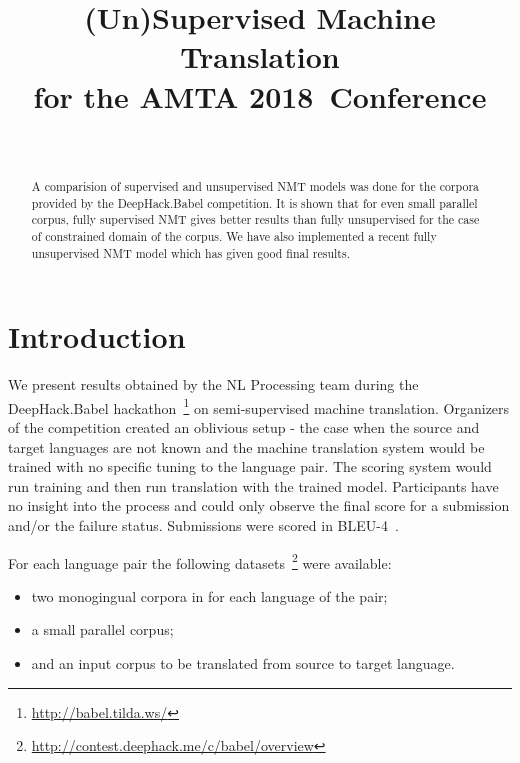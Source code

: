 \documentclass[]{article}
\newcommand{\confname}{AMTA 2018}
\begin{document}
\title{\bf (Un)Supervised Machine Translation \\
  for the \confname~Conference}
\author{ \hfill  {}\\
\AND
         \hfill {}
}

\maketitle
\pagestyle{empty}

\begin{abstract}
  A comparision of supervised and unsupervised NMT models was done for the corpora provided by the DeepHack.Babel competition.
  It is shown that for even small parallel corpus, fully supervised NMT gives better results than fully unsupervised for the case of constrained domain of the corpus.
  We have also implemented a recent fully unsupervised NMT model which has given good final results.
\end{abstract}

\section{Introduction}

We present results obtained by the NL Processing team during the DeepHack.Babel hackathon~\footnote{\url{http://babel.tilda.ws/}} on semi-supervised machine translation.
Organizers of the competition created an oblivious setup - the case when the source and target languages are not known and the machine translation system would be trained with no specific tuning to the language pair.
The scoring system would run training and then run translation with the trained model.
Participants have no insight into the process and could only observe the final score for a submission and/or the failure status.
Submissions were scored in BLEU-4~\citep{papineni2002bleu}.

For each language pair the following datasets~\footnote{\url{http://contest.deephack.me/c/babel/overview}} were available:
\begin{itemize}
  \item two monogingual corpora in for each language of the pair;
  \item a small parallel corpus;
  \item and an input corpus to be translated from source to target language.
\end{itemize}
\end{document}
